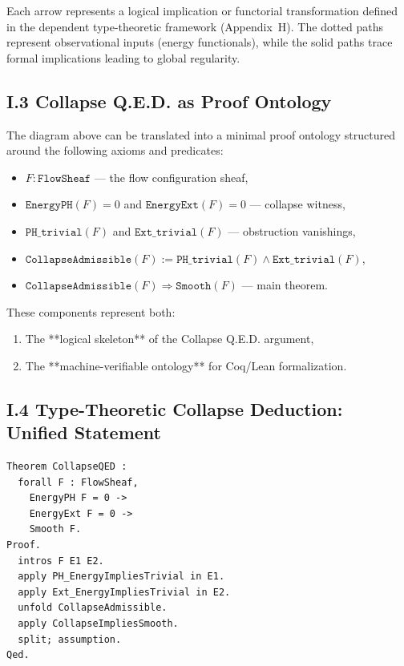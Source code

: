 \documentclass[11pt]{article}
\begin{document}
Each arrow represents a logical implication or functorial transformation defined in the dependent type-theoretic framework (Appendix~H). The dotted paths represent observational inputs (energy functionals), while the solid paths trace formal implications leading to global regularity.

\subsection*{I.3 Collapse Q.E.D. as Proof Ontology}

The diagram above can be translated into a minimal proof ontology structured around the following axioms and predicates:

\begin{itemize}
  \item $F : \texttt{FlowSheaf}$ — the flow configuration sheaf,
  \item $\texttt{EnergyPH}(F) = 0$ and $\texttt{EnergyExt}(F) = 0$ — collapse witness,
  \item $\texttt{PH\_trivial}(F)$ and $\texttt{Ext\_trivial}(F)$ — obstruction vanishings,
  \item $\texttt{CollapseAdmissible}(F) := \texttt{PH\_trivial}(F) \land \texttt{Ext\_trivial}(F)$,
  \item $\texttt{CollapseAdmissible}(F) \Rightarrow \texttt{Smooth}(F)$ — main theorem.
\end{itemize}

These components represent both:
\begin{enumerate}
  \item The **logical skeleton** of the Collapse Q.E.D. argument,
  \item The **machine-verifiable ontology** for Coq/Lean formalization.
\end{enumerate}

\subsection*{I.4 Type-Theoretic Collapse Deduction: Unified Statement}

\begin{lstlisting}[language=Coq, caption=Unified Collapse Q.E.D. Statement]
Theorem CollapseQED :
  forall F : FlowSheaf,
    EnergyPH F = 0 ->
    EnergyExt F = 0 ->
    Smooth F.
Proof.
  intros F E1 E2.
  apply PH_EnergyImpliesTrivial in E1.
  apply Ext_EnergyImpliesTrivial in E2.
  unfold CollapseAdmissible.
  apply CollapseImpliesSmooth.
  split; assumption.
Qed.
\end{lstlisting}
\end{document}
